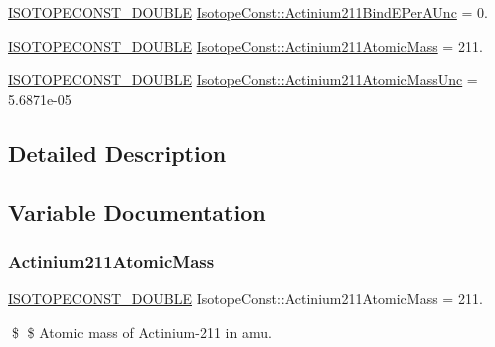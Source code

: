 \begin{DoxyCompactItemize}
\mbox{\hyperlink{group___isotope_const-_macros_ga8f45a7272ce02c0b4c65c44636ed719a}{I\+S\+O\+T\+O\+P\+E\+C\+O\+N\+S\+T\+\_\+\+D\+O\+U\+B\+LE}} \mbox{\hyperlink{group___isotope_const-_actinium-_ac211_ga9e3e656e3a1a84985274bbee63001595}{Isotope\+Const\+::\+Actinium211\+Bind\+E\+Per\+A\+Unc}} = 0.
\item 
\mbox{\hyperlink{group___isotope_const-_macros_ga8f45a7272ce02c0b4c65c44636ed719a}{I\+S\+O\+T\+O\+P\+E\+C\+O\+N\+S\+T\+\_\+\+D\+O\+U\+B\+LE}} \mbox{\hyperlink{group___isotope_const-_actinium-_ac211_gae956b9c61acd4c4d02f03f5b9e5e17a7}{Isotope\+Const\+::\+Actinium211\+Atomic\+Mass}} = 211.
\item 
\mbox{\hyperlink{group___isotope_const-_macros_ga8f45a7272ce02c0b4c65c44636ed719a}{I\+S\+O\+T\+O\+P\+E\+C\+O\+N\+S\+T\+\_\+\+D\+O\+U\+B\+LE}} \mbox{\hyperlink{group___isotope_const-_actinium-_ac211_ga2552b7d3edfede91c47b1d15af6009d9}{Isotope\+Const\+::\+Actinium211\+Atomic\+Mass\+Unc}} = 5.\+6871e-\/05
\end{DoxyCompactItemize}


\subsection{Detailed Description}


\subsection{Variable Documentation}
\mbox{\label{group___isotope_const-_actinium-_ac211_gae956b9c61acd4c4d02f03f5b9e5e17a7}} 
\subsubsection{\texorpdfstring{Actinium211\+Atomic\+Mass}{Actinium211AtomicMass}}
{\footnotesize\ttfamily \mbox{\hyperlink{group___isotope_const-_macros_ga8f45a7272ce02c0b4c65c44636ed719a}{I\+S\+O\+T\+O\+P\+E\+C\+O\+N\+S\+T\+\_\+\+D\+O\+U\+B\+LE}} Isotope\+Const\+::\+Actinium211\+Atomic\+Mass = 211.}

\$ \$ Atomic mass of Actinium-\/211 in amu. \mbox{\label{group___isotope_const-_actinium-_ac211_ga2552b7d3edfede91c47b1d15af6009d9}} 
